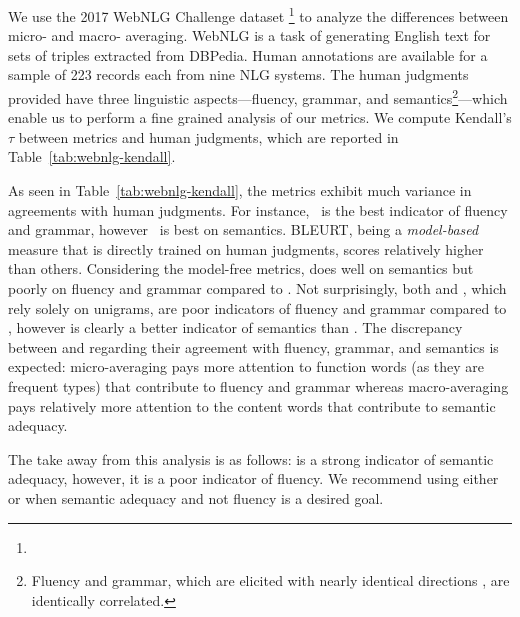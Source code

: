 We use the 2017 WebNLG Challenge dataset \cite{gardent2017webNLG-corpus, shimorina2018webnlg-human-eval}\footnote{} to analyze the differences between micro- and macro- averaging. 
WebNLG is a task of generating English text for sets of triples extracted from DBPedia.
Human annotations are available for a sample of 223 records each from nine NLG systems.
The human judgments provided have three linguistic aspects---fluency, grammar, and semantics\footnote{Fluency and grammar, which are elicited with nearly identical directions \cite{gardent2017webNLG-corpus}, are identically correlated.}---which enable us to perform a fine grained analysis of our metrics.
We compute Kendall's $\tau$ between metrics and human judgments, which are reported in Table~\ref{tab:webnlg-kendall}.

As seen in Table~\ref{tab:webnlg-kendall}, the metrics exhibit much variance in agreements with human judgments. %
For instance, \blrtmd\ is the best indicator of fluency and grammar, however \blrtmn\ is best on semantics. 
BLEURT, being a \textit{model-based} measure that is directly trained on human judgments, scores relatively higher than others.
Considering the model-free metrics,  does well on semantics but poorly on fluency and grammar compared to \bleu.
Not surprisingly, both  and , which rely solely on unigrams, are poor indicators of fluency and grammar compared to \bleu, however  is clearly a better indicator of semantics than \bleu. 
The discrepancy between  and  regarding their agreement with fluency, grammar, and semantics is expected: micro-averaging pays more attention to function words (as they are frequent types) that contribute to fluency and grammar whereas macro-averaging pays relatively more attention to the content words that contribute to semantic adequacy. 

The take away from this analysis is as follows:  is a strong indicator of semantic adequacy, however, it is a poor indicator of fluency. We recommend using either  or  when semantic adequacy and not fluency is a desired goal.



